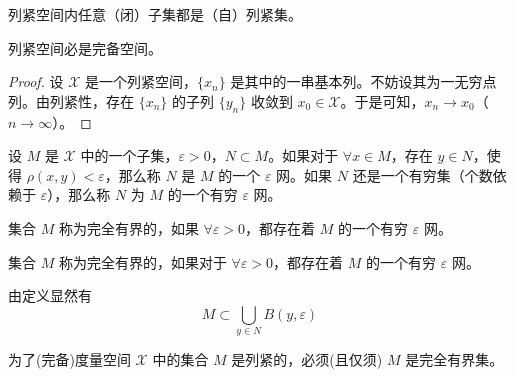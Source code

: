 \documentclass[lang=cn,newtx,10pt,scheme=chinese,thmcnt=chapter]{elegantbook}
\begin{document}
\begin{proposition}
列紧空间内任意（闭）子集都是（自）列紧集。
\end{proposition}

\begin{proposition}
列紧空间必是完备空间。
\end{proposition}

\begin{proof}
设 \( \mathscr{X} \) 是一个列紧空间，\( \{x_n\} \) 是其中的一串基本列。不妨设其为一无穷点列。由列紧性，存在 \( \{x_n\} \) 的子列 \( \{y_n\} \) 收敛到 \( x_0 \in \mathscr{X} \)。于是可知，\( x_n \to x_0 \)（\( n \to \infty \)）。
\end{proof}

\begin{definition}[ε 网]
设 \( M \) 是 \( \mathscr{X} \) 中的一个子集，\( \varepsilon > 0 \)，\( N \subset M \)。如果对于 \( \forall x \in M \)，存在 \( y \in N \)，使得 \( \rho(x, y) < \varepsilon \)，那么称 \( N \) 是 \( M \) 的一个 \( \varepsilon \) 网。如果 \( N \) 还是一个有穷集（个数依赖于 \( \varepsilon \)），那么称 \( N \) 为 \( M \) 的一个有穷 \( \varepsilon \) 网。
\end{definition}

\begin{definition}[完全有界]
集合 \( M \) 称为完全有界的，如果 \( \forall \varepsilon > 0 \)，都存在着 \( M \) 的一个有穷 \( \varepsilon \) 网。
\end{definition}

\begin{definition}[完全有界]
集合 \( M \) 称为完全有界的，如果对于 \( \forall \varepsilon > 0 \)，都存在着 \( M \) 的一个有穷 \( \varepsilon \) 网。
\end{definition}

\begin{note}
由定义显然有
\[
M \subset \bigcup_{y \in N} B(y, \varepsilon)
\]
\end{note}

\begin{theorem}[Hausdorff]
为了(完备)度量空间 \( \mathscr{X} \) 中的集合 \( M \) 是列紧的，必须(且仅须) \( M \) 是完全有界集。
\end{theorem}
\end{document}
